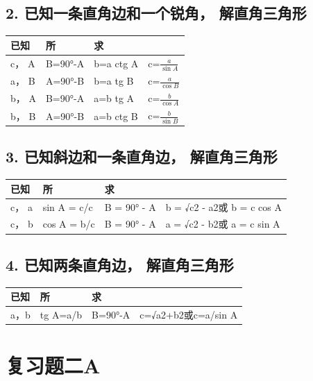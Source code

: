 \subsection{2. 已知一条直角边和一个锐角， 解直角三角形}

{\def\LTcaptype{none} %
\begin{longtable}[]{@{}llll@{}}
\toprule\noalign{}
已知 & 所 & 求 & \\
\midrule\noalign{}
\endhead
\bottomrule\noalign{}
\endlastfoot
c， A & B=90°-A & b=a ctg A & c=\(\frac{a}{\sin A}\) \\
a， B & A=90°-B & b=a tg B & c=\(\frac{a}{\cos B}\) \\
b， A & B=90°-A & a=b tg A & c=\(\frac{b}{\cos A}\) \\
b， B & A=90°-B & a=b ctg B & c=\(\frac{b}{\sin B}\) \\
\end{longtable}
}

\subsection{3. 已知斜边和一条直角边， 解直角三角形}

{\def\LTcaptype{none} %
\begin{longtable}[]{@{}llll@{}}
\toprule\noalign{}
已知 & 所 & 求 & \\
\midrule\noalign{}
\endhead
\bottomrule\noalign{}
\endlastfoot
c， a & sin A = c/c & B = 90° - A & b = √c2 - a2或 b = c cos A \\
c， b & cos A = b/c & B = 90° - A & a = √c2 - b2或 a = c sin A \\
\end{longtable}
}

\subsection{4. 已知两条直角边， 解直角三角形}

{\def\LTcaptype{none} %
\begin{longtable}[]{@{}llll@{}}
\toprule\noalign{}
已知 & 所 & 求 & \\
\midrule\noalign{}
\endhead
\bottomrule\noalign{}
\endlastfoot
a，b & tg A=a/b & B=90°-A & c=√a2+b2或c=a/sin A \\
\end{longtable}
}

\section{复习题二A}

